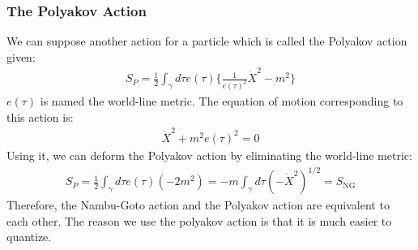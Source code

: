 \subsubsection{The Polyakov Action}
We can suppose another action for a particle which is called the Polyakov action given:
\begin{align}
    S_{P} = \frac{1}{2} \int _{\gamma} d\tau e(\tau) \lbrace \frac{1}{e(\tau)^{2}} \dot{X}^{2} - m^{2} \rbrace
\end{align}
$e(\tau)$ is named the world-line metric. The equation of motion corresponding to this action is:
\begin{align}
    \dot{X}^{2} + m^{2} e(\tau) ^{2} =0
\end{align}
Using it, we can deform the Polyakov action by eliminating the world-line metric:
\begin{align}
    S_{P} = \frac{1}{2} \int _{\gamma} d\tau e(\tau) (-2m^{2}) = -m \int _{\gamma} d\tau(-\dot{X}^{2})^{1/2} = S_{\text{NG}}
\end{align}
Therefore, the Nambu-Goto action and the Polyakov action are equivalent to each other. The reason we use the polyakov action is that it is much easier to quantize.
